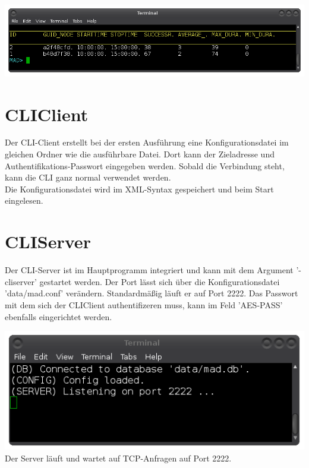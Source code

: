\documentclass[12pt,a4paper]{report}
\begin{document}
\begin{onehalfspace}
\begin{center}
\includegraphics[scale=0.5]{img/db_summary.png}
\end{center}

\chapter{CLIClient}

Der CLI-Client erstellt bei der ersten Ausführung eine Konfigurationsdatei im gleichen Ordner wie die ausführbare Datei. Dort kann der Zieladresse und Authentifikations-Passwort eingegeben werden. Sobald die Verbindung steht, kann die CLI ganz normal verwendet werden.\\
Die Konfigurationsdatei wird im XML-Syntax gespeichert und beim Start eingelesen.

\chapter{CLIServer}

Der CLI-Server ist im Hauptprogramm integriert und kann mit dem Argument '-cliserver' gestartet werden. Der Port lässt sich über die Konfigurationsdatei 'data/mad.conf' verändern. Standardmäßig läuft er auf Port 2222. Das Passwort mit dem sich der CLIClient authentifizeren muss, kann im Feld 'AES-PASS' ebenfalls eingerichtet werden.

\begin{center}
\includegraphics[scale=0.6]{img/cli_server.png}\\
Der Server läuft und wartet auf TCP-Anfragen auf Port 2222.
\end{center}


\end{onehalfspace}
\end{document}
